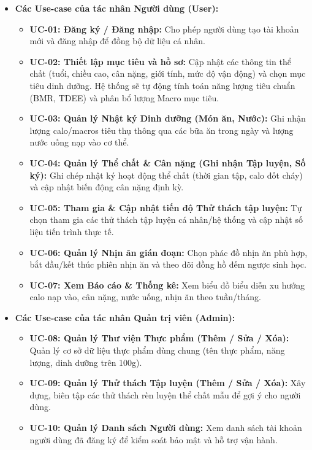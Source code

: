 \documentclass[12pt,a4paper]{article}
\begin{document}
\begin{itemize}
    \item \textbf{Các Use-case của tác nhân Người dùng (User):}
    \begin{itemize}
        \item \textbf{UC-01: Đăng ký / Đăng nhập:} Cho phép người dùng tạo tài khoản mới và đăng nhập để đồng bộ dữ liệu cá nhân.
        \item \textbf{UC-02: Thiết lập mục tiêu và hồ sơ:} Cập nhật các thông tin thể chất (tuổi, chiều cao, cân nặng, giới tính, mức độ vận động) và chọn mục tiêu dinh dưỡng. Hệ thống sẽ tự động tính toán năng lượng tiêu chuẩn (BMR, TDEE) và phân bổ lượng Macro mục tiêu.
        \item \textbf{UC-03: Quản lý Nhật ký Dinh dưỡng (Món ăn, Nước):} Ghi nhận lượng calo/macros tiêu thụ thông qua các bữa ăn trong ngày và lượng nước uống nạp vào cơ thể.
        \item \textbf{UC-04: Quản lý Thể chất \& Cân nặng (Ghi nhận Tập luyện, Số ký):} Ghi chép nhật ký hoạt động thể chất (thời gian tập, calo đốt cháy) và cập nhật biến động cân nặng định kỳ.
        \item \textbf{UC-05: Tham gia \& Cập nhật tiến độ Thử thách tập luyện:} Tự chọn tham gia các thử thách tập luyện cá nhân/hệ thống và cập nhật số liệu tiến trình thực tế.
        \item \textbf{UC-06: Quản lý Nhịn ăn gián đoạn:} Chọn phác đồ nhịn ăn phù hợp, bắt đầu/kết thúc phiên nhịn ăn và theo dõi đồng hồ đếm ngược sinh học.
        \item \textbf{UC-07: Xem Báo cáo \& Thống kê:} Xem biểu đồ biểu diễn xu hướng calo nạp vào, cân nặng, nước uống, nhịn ăn theo tuần/tháng.
    \end{itemize}
    
    \item \textbf{Các Use-case của tác nhân Quản trị viên (Admin):}
    \begin{itemize}
        \item \textbf{UC-08: Quản lý Thư viện Thực phẩm (Thêm / Sửa / Xóa):} Quản lý cơ sở dữ liệu thực phẩm dùng chung (tên thực phẩm, năng lượng, dinh dưỡng trên 100g).
        \item \textbf{UC-09: Quản lý Thử thách Tập luyện (Thêm / Sửa / Xóa):} Xây dựng, biên tập các thử thách rèn luyện thể chất mẫu để gợi ý cho người dùng.
        \item \textbf{UC-10: Quản lý Danh sách Người dùng:} Xem danh sách tài khoản người dùng đã đăng ký để kiểm soát bảo mật và hỗ trợ vận hành.
\end{itemize}
\end{itemize}
\end{document}
